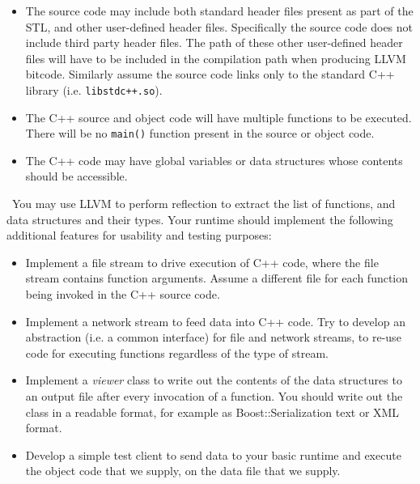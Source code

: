 \documentclass{article}
\newcommand{\comment}[1]{}
\begin{document}
\begin{itemize}
\item The source code may include both standard header files present as part of the STL, and other user-defined header files. Specifically the source code does not include third party header files. The path of these other user-defined header files will have to be included in the compilation path when producing LLVM bitcode. Similarly assume the source code links only to the standard C++ library (i.e. \texttt{libstdc++.so}).

\item The C++ source and object code will have multiple functions to be executed. There will be no \texttt{main()} function present in the source or object code.
\item The C++ code may have global variables or data structures whose contents should be accessible.
\end{itemize}

\noindent~You may use LLVM to perform reflection to extract the list of functions, and data structures and their types.
Your runtime should implement the following additional features for usability and testing purposes:

\begin{itemize}
\item Implement a file stream to drive execution of C++ code, where the file stream contains function arguments. Assume a different file for each function being invoked in the C++ source code.

\item Implement a network stream to feed data into C++ code. Try to develop an abstraction (i.e. a common interface) for file and network streams, to re-use code for executing functions regardless of the type of stream.
\item Implement a \textit{viewer} class to write out the contents of the data structures to an output file after every invocation of a function. You should write out the class in a readable format, for example as Boost::Serialization text or XML format.
\item Develop a simple test client to send data to your basic runtime and execute the object code that we supply, on the data file that we supply. 
\end{itemize}

\comment{
\noindent In this assigment you should hand in the following:

\begin{itemize}
\item Your output file from running the source and object code we provide on our input file.
\item Your source code, tar'd and with a brief README on how to compile and run your code.
\end{itemize}
}
\end{document}
